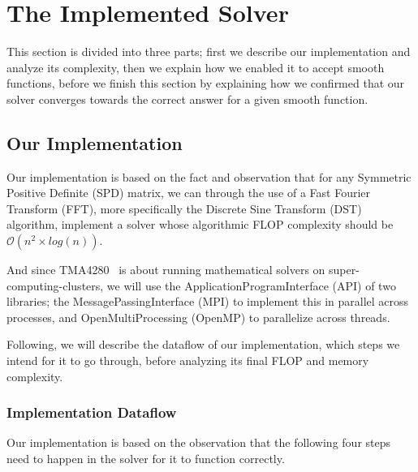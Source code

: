\documentclass[fontsize=11pt,paper=a4,titlepage]{article}
\begin{document}
\section{The Implemented Solver}

This section is divided into three parts; first we describe our implementation
and analyze its complexity, then we explain how we enabled it to accept smooth
functions, before we finish this section by explaining how we confirmed that our
solver converges towards the correct answer for a given smooth function.

\subsection{Our Implementation}
\label{sec:Impl}

Our implementation is based on the fact and observation that for any Symmetric
Positive Definite (SPD) matrix, we can through the use of a Fast Fourier
Transform (FFT), more specifically the Discrete Sine Transform (DST)
algorithm, implement a solver whose algorithmic FLOP complexity should be
$\mathcal{O}(n^2\times log(n))$.

And since TMA4280~\cite{tma4280} is about running mathematical solvers on
super-computing-clusters, we will use the ApplicationProgramInterface (API)
of two libraries; the MessagePassingInterface (MPI) to implement this in
parallel across processes, and OpenMultiProcessing (OpenMP) to parallelize
across threads.

Following, we will describe the dataflow of our implementation, which steps we
intend for it to go through, before analyzing its final FLOP and memory
complexity.

\subsubsection{Implementation Dataflow}
\label{sssec:dataflow}

Our implementation is based on the observation that the following four steps
need to happen in the solver for it to function correctly.
\end{document}
